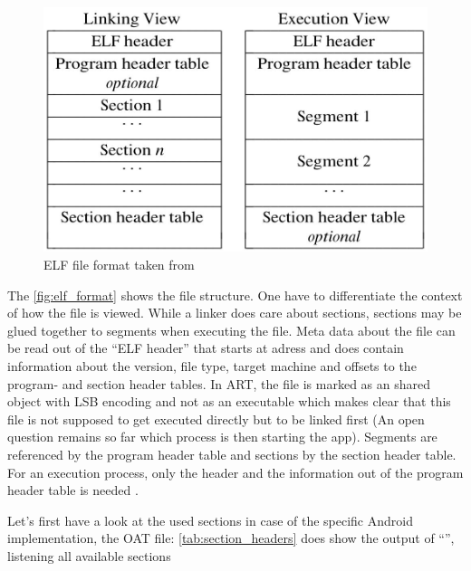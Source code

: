\begin{figure}[htb]
  \centering
  \includegraphics[scale=0.4]{figures/elf_format}
  \caption[ELF file format]{ELF file format taken from \parencite{portable_formats_spec}}
  \label{fig:elf_format}
\end{figure}

The \autoref{fig:elf_format} shows the file structure.
One have to differentiate the context of how the file is viewed.
While a linker does care about sections, sections may be
glued together to segments when executing the file.
Meta data about the file can be read out of the ``ELF header''
that starts at adress  and does contain
information about the version, file type, target machine and
offsets to the program- and section header tables.
In ART, the file is marked as an shared object with LSB encoding
and not as an executable which makes clear that this file is not
supposed to get executed directly but to be linked first
(An open question remains so far which process is then starting
the app).
Segments are referenced by the program header table and sections
by the section header table. For an execution process, only the header
and the information out of the program header table is needed
\parencite{life_of_binaries}.

Let's first have a look at the used sections in case of the specific
Android implementation, the OAT file:
\autoref{tab:section_headers} does show the output of
``'', listening all available sections


